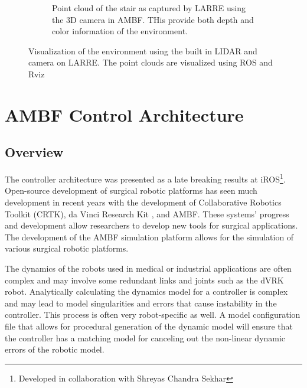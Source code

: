\begin{figure}[h]
\begin{subfigure}{\linewidth}
        \caption{Point cloud of the stair as captured by LARRE using the 3D camera in AMBF. THis provide both depth and color information of the environment.}
        \label{fig:DEPTH}
    \end{subfigure}
   \caption[LIDAR built into LARREs hip]{Visualization of the environment using the built in LIDAR and camera on LARRE. The point clouds are visualized using ROS and Rviz}
   \label{fig:sensors}
\end{figure}
 
 
 
 \section{AMBF Control Architecture}
 \label{sec:controlarchitecture}
 
 \subsection{Overview}
 The controller architecture was presented as a late breaking results at iROS\footnote{Developed in collaboration with Shreyas Chandra Sekhar}\cite{poster}. Open-source development of surgical robotic platforms has seen much development in recent years with the development of Collaborative Robotics Toolkit (CRTK)\cite{su2020collaborative}, da Vinci Research Kit \cite{d2021accelerating}, and AMBF. These systems' progress and development allow researchers to develop new tools for surgical applications. The development of the  AMBF simulation platform allows for the simulation of various surgical robotic platforms. 

The dynamics of the robots used in medical or industrial applications are often complex and may involve some redundant links and joints such as the dVRK robot\cite{wang2019convex}. Analytically calculating the dynamics model for a controller is complex and may lead to model singularities and errors that cause instability in the controller. This process is often very robot-specific as well. A model configuration file that allows for procedural generation of the dynamic model will ensure that the controller has a matching model for canceling out the non-linear dynamic errors of the robotic model.

